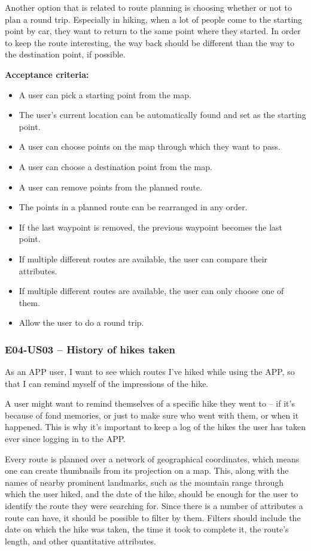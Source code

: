 Another option that is related to route planning is choosing whether or not to plan a round trip.
Especially in hiking, when a lot of people come to the starting point by car, they want to return to the same point where they started.
In order to keep the route interesting, the way back should be different than the way to the destination point, if possible.

\textbf{Acceptance criteria:}
\begin{itemize}
    \item A user can pick a starting point from the map.
    \item The user's current location can be automatically found and set as the starting point.
    \item A user can choose points on the map through which they want to pass.
    \item A user can choose a destination point from the map.
    \item A user can remove points from the planned route.
    \item The points in a planned route can be rearranged in any order.
    \item If the last waypoint is removed, the previous waypoint becomes the last point.
    \item If multiple different routes are available, the user can compare their attributes.
    \item If multiple different routes are available, the user can only choose one of them.
    \item Allow the user to do a round trip.
\end{itemize}

\subsubsection*{E04-US03 -- History of hikes taken}
As an APP user, I want to see which routes I've hiked while using the APP, so that I can remind myself of the impressions of the hike.

A user might want to remind themselves of a specific hike they went to -- if it's because of fond memories, or just to make sure who went with them, or when it happened.
This is why it's important to keep a log of the hikes the user has taken ever since logging in to the APP.

Every route is planned over a network of geographical coordinates, which means one can create thumbnails from its projection on a map.
This, along with the names of nearby prominent landmarks, such as the mountain range through which the user hiked, and the date of the hike, should be enough for the user to identify the route they were searching for.
Since there is a number of attributes a route can have, it should be possible to filter by them.
Filters should include the date on which the hike was taken, the time it took to complete it, the route's length, and other quantitative attributes.

